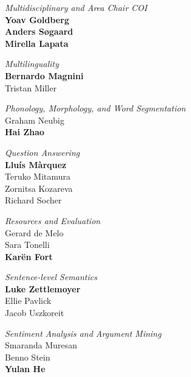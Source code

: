 \emph{Multidisciplinary and Area Chair COI}\\
\hspace*{5mm}\textbf{Yoav Goldberg} \\
\hspace*{5mm}\textbf{Anders Søgaard} \\
\hspace*{5mm}\textbf{Mirella Lapata}

\emph{Multilinguality}\\
\hspace*{5mm}\textbf{Bernardo Magnini} \\
\hspace*{5mm}Tristan Miller

\emph{Phonology, Morphology, and Word Segmentation} \\
\hspace*{5mm}Graham Neubig \\
\hspace*{5mm}\textbf{Hai Zhao}

\emph{Question Answering}\\
\hspace*{5mm}\textbf{Lluís Màrquez} \\
\hspace*{5mm}Teruko Mitamura \\
\hspace*{5mm}Zornitsa Kozareva \\
\hspace*{5mm}Richard Socher

\emph{Resources and Evaluation}\\
\hspace*{5mm}Gerard de Melo \\
\hspace*{5mm}Sara Tonelli \\
\hspace*{5mm}\textbf{Karën Fort}

\emph{Sentence-level Semantics} \\
\hspace*{5mm}\textbf{Luke Zettlemoyer} \\
\hspace*{5mm}Ellie Pavlick \\
\hspace*{5mm}Jacob Uszkoreit

\emph{Sentiment Analysis and Argument Mining} \\
\hspace*{5mm}Smaranda Muresan \\
\hspace*{5mm}Benno Stein \\
\hspace*{5mm}\textbf{Yulan He}

